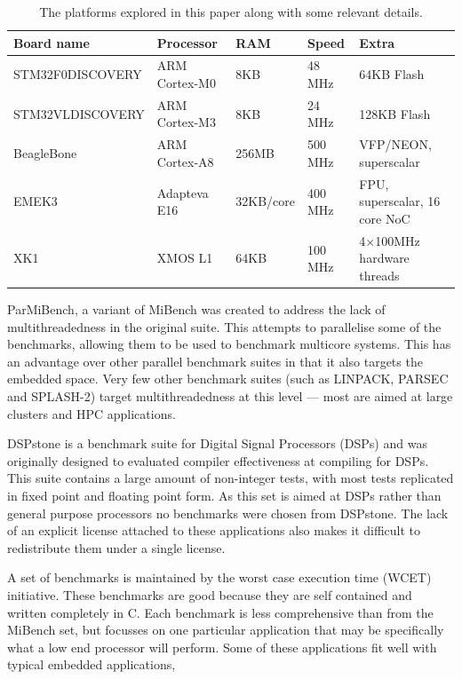 \documentclass[twocolumn]{article}
\begin{document}
\begin{table}[!hbt]
	\centering
	\begin{tabular}{l l l l l}
		\textbf{Board name} & \textbf{Processor} & \textbf{RAM} & \textbf{Speed} & \textbf{Extra} \\
		\hline
		STM32F0DISCOVERY	& ARM Cortex-M0 		& 8KB		& 48 MHz		  & 64KB Flash\\
		STM32VLDISCOVERY	& ARM Cortex-M3 		& 8KB		& 24 MHz		  & 128KB Flash\\
		BeagleBone			& ARM Cortex-A8 		& 256MB		& 500 MHz		  & VFP/NEON, superscalar\\
		EMEK3				& Adapteva E16 			& 32KB/core & 400 MHz		  & FPU, superscalar, 16 core NoC\\
		XK1					& XMOS L1 				& 64KB		& 100 MHz 		& 4$\times$100MHz hardware threads \\
	\end{tabular}
	\caption{The platforms explored in this paper along with some relevant details.}
	\label{Table:Platforms}
\end{table}
ParMiBench, a variant of MiBench was created to address the lack of multithreadedness in the original suite. This attempts to parallelise some of the benchmarks, allowing them to be used to benchmark multicore systems. This has an advantage over other parallel benchmark suites in that it also targets the embedded space. Very few other benchmark suites (such as LINPACK, PARSEC and SPLASH-2\cite{Bienia2008}) target multithreadedness at this level --- most are aimed at large clusters and HPC applications.

DSPstone\cite{Zivojnovic} is a benchmark suite for Digital Signal Processors (DSPs) and was originally designed to evaluated compiler effectiveness at compiling for DSPs. This suite contains a large amount of non-integer tests, with most tests replicated in fixed point and floating point form. As this set is aimed at DSPs rather than general purpose processors no benchmarks were chosen from DSPstone. The lack of an explicit license attached to these applications also makes it difficult to redistribute them under a single license.

A set of benchmarks is maintained by the worst case execution time (WCET) initiative\cite{Gustafsson2010}. These benchmarks are good because they are self contained and written completely in C. Each benchmark is less comprehensive than from the MiBench set, but focusses on one particular application that may be specifically what a low end processor will perform. Some of these applications fit well with typical embedded applications,
\end{document}
